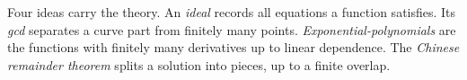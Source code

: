 \begin{keypoint}
Four ideas carry the theory. An \emph{ideal} records all equations a function satisfies. Its \emph{gcd} separates a curve part from finitely many points. \emph{Exponential-polynomials} are the functions with finitely many derivatives up to linear dependence. The \emph{Chinese remainder theorem} splits a solution into pieces, up to a finite overlap.
\end{keypoint}

